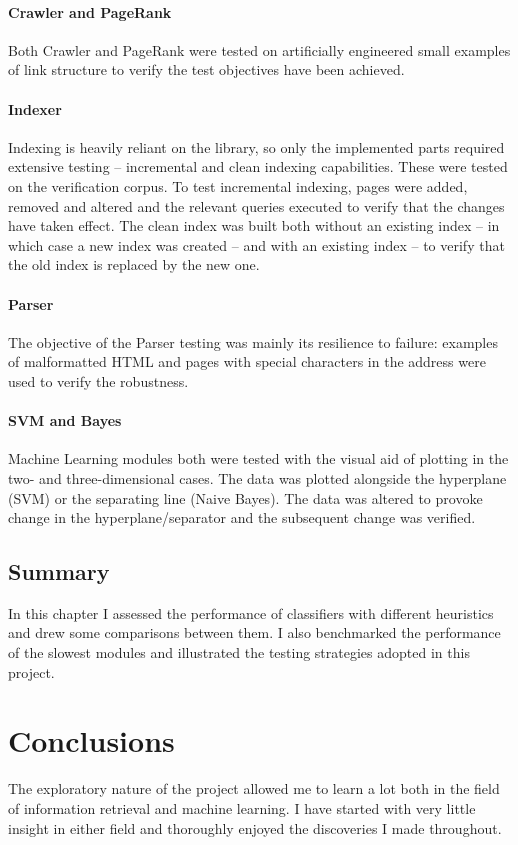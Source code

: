 \documentclass[12pt,notitlepage,twoside]{scrbook}
\begin{document}
\subsubsection{Crawler and PageRank} Both Crawler and PageRank were tested on artificially
engineered small examples of link structure to verify the test objectives have been
achieved.  \subsubsection{Indexer} Indexing is heavily reliant on the library, so only the
implemented parts required extensive testing -- incremental and clean indexing
capabilities. These were tested on the verification corpus.  To test incremental indexing,
pages were added, removed and altered and the relevant queries executed to verify that the
changes have taken effect. The clean index was built both without an existing index -- in
which case a new index was created -- and with an existing index -- to verify that the old
index is replaced by the new one.  \subsubsection{Parser} The objective of the Parser
testing was mainly its resilience to failure: examples of malformatted HTML and pages with
special characters in the address were used to verify the robustness. \subsubsection{SVM
and Bayes} Machine Learning modules both were tested with the visual aid of plotting in
the two- and three-dimensional cases. The data was plotted alongside the hyperplane (SVM)
or the separating line (Naive Bayes). The data was altered to provoke change in the
hyperplane/separator and the subsequent change was verified.
\section{Summary}
In this chapter I assessed the performance of classifiers with different
heuristics and drew some comparisons between them. I also benchmarked the
performance of the slowest modules and illustrated the testing strategies
adopted in this project.

\chapter{Conclusions}
The exploratory nature of the project allowed me to learn a lot both in the field of
information retrieval and machine learning. I have started with very little insight in
either field and thoroughly enjoyed the discoveries I made throughout.
\end{document}
